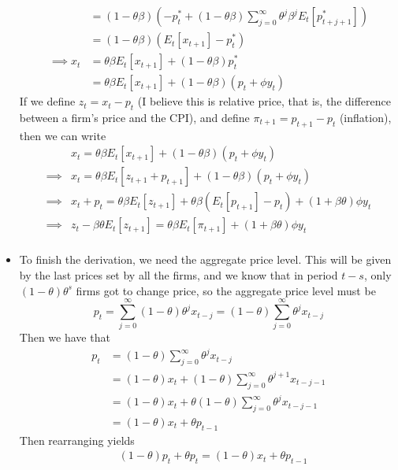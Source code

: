 \documentclass[12pt]{article}
\begin{document}
\begin{itemize}
\[\begin{split}
        &= (1-\theta\beta)\left(-p_t^* + (1-\theta\beta)\sum_{j=0}^{\infty}\theta^j\beta^jE_t[p_{t+j+1}^*]\right)\\
        &= (1-\theta\beta)\left(E_t[x_{t+1}]-p_t^* \right)\\ 
        \implies x_t &= \theta\beta E_t[x_{t+1}] + (1-\theta\beta)p_t^* \\
        &= \theta\beta E_t[x_{t+1}] + (1-\theta\beta)(p_t + \phi y_t)
    \end{split}\]
    If we define $z_t = x_t - p_t$ (I believe this is relative price, that is, the difference between a firm's price and the CPI), and define $\pi_{t+1} = p_{t+1} - p_t$ (inflation), then we can write
    \begin{equation}\label{Calvo Intermediate}
        \begin{split}
            &x_t = \theta\beta E_t[x_{t+1}] + (1-\theta\beta)(p_t + \phi y_t) \\
            \implies &x_t = \theta\beta E_t[z_{t+1} + p_{t+1}] + (1-\theta\beta)(p_t + \phi y_t) \\
            \implies &x_t + p_t = \theta\beta E_t[z_{t+1}] + \theta\beta \left(E_t[p_{t+1}] - p_t\right) + (1+\beta\theta)\phi y_t \\
            \implies &z_t -\beta\theta E_t[z_{t+1}] = \theta\beta E_t[\pi_{t+1}] + (1+\beta\theta)\phi y_t \\
        \end{split}
    \end{equation}
    \item To finish the derivation, we need the aggregate price level. This will be given by the last prices set by all the firms, and we know that in period $t-s$, only $(1-\theta)\theta^s$ firms got to change price, so the aggregate price level must be
    \[p_t = \sum_{j=0}^{\infty}(1-\theta)\theta^jx_{t-j} = (1-\theta)\sum_{j=0}^{\infty}\theta^jx_{t-j}\]
    Then we have that
    \[\begin{split}
        p_t &= (1-\theta)\sum_{j=0}^{\infty}\theta^jx_{t-j} \\
        &= (1-\theta)x_t + (1-\theta)\sum_{j=0}^{\infty}\theta^{j+1}x_{t-j-1} \\
        &= (1-\theta)x_t + \theta(1-\theta)\sum_{j=0}^{\infty}\theta^jx_{t-j-1} \\
        &= (1-\theta)x_t + \theta p_{t-1}
    \end{split}\]
    Then rearranging yields
    \[\begin{split}
        &(1-\theta)p_t + \theta p_t = (1-\theta)x_t + \theta p_{t-1} \\

\end{split}\]
\end{itemize}
\end{document}
